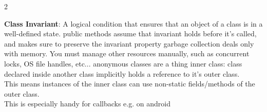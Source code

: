 \documentclass{article}
\def \columncount {2}
\renewcommand\labelitemi{\hspace{-1in}\tiny$\bullet$}
\renewcommand\labelitemii{\labelitemi}
\begin{document}
\begin{multicols*}{\columncount}
\begin{outline}[longenum]





  \1 \textbf{Class Invariant}: A logical condition that ensures that an object of a class is in a well-defined state.
    \2 public methods assume that invariant holds before it's called, and makes sure to preserve the invariant property
  \1 garbage collection deals only with memory. You must manage other resources manually, such as concurrent locks, OS file handles, etc...
  \1 anonymous classes are a thing
  \1 inner class:
    class declared inside another class implicitly holds a reference to it's outer class. 
    \\ This means instances of the inner class can use non-static fields/methods of the outer class.
    \\ This is especially handy for callbacks e.g. on android


\end{outline}
\end{multicols*}
\end{document}
